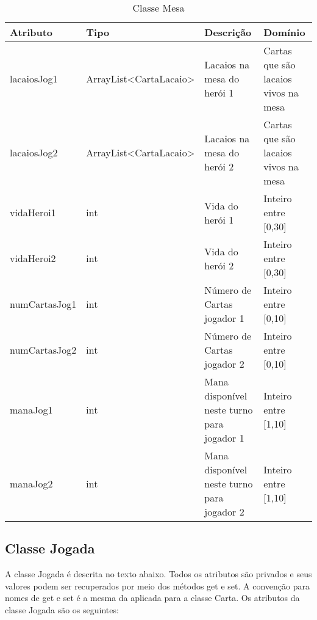 \documentclass[10pt]{article}
\begin{document}
\renewcommand{\arraystretch}{1.15}
\begin{table}[h]
\centering
\caption{Classe Mesa}
\label{tab:mesa}
\begin{tabular}{|l|l|p{4cm}|p{4cm}|}
\hline
Atributo & Tipo & Descrição & Domínio \\ \hline
lacaiosJog1   & ArrayList<CartaLacaio> & Lacaios na mesa do herói 1 & Cartas que são lacaios vivos na mesa \\ \hline
lacaiosJog2   & ArrayList<CartaLacaio> & Lacaios na mesa do herói 2 & Cartas que são lacaios vivos na mesa \\ \hline
vidaHeroi1      & int & Vida do herói 1 & Inteiro entre [0,30] \\ \hline
vidaHeroi2      & int & Vida do herói 2 & Inteiro entre [0,30] \\ \hline
numCartasJog1   & int & Número de Cartas jogador 1 & Inteiro entre [0,10] \\ \hline
numCartasJog2   & int & Número de Cartas jogador 2  & Inteiro entre [0,10] \\ \hline
manaJog1      & int & Mana disponível neste turno para jogador 1 & Inteiro entre [1,10] \\ \hline
manaJog2      & int & Mana disponível neste turno para jogador 2 & Inteiro entre [1,10] \\ \hline
\end{tabular}
\end{table}

\subsection{Classe Jogada}

A classe Jogada é descrita no texto abaixo. Todos os atributos são privados e seus valores podem ser recuperados por meio dos métodos get e set. A convenção para nomes de get e set é a mesma da aplicada para a classe Carta. Os atributos da classe Jogada são os seguintes:
\end{document}
